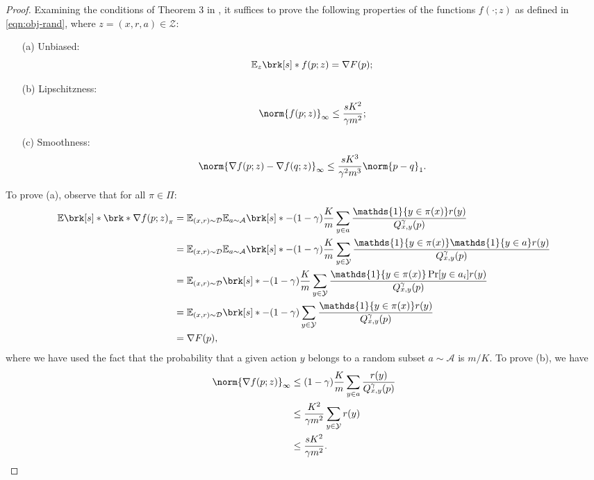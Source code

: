 \documentclass[11pt]{article}
\renewcommand{\ind}[1]{\mathds{1}\{#1\}}
\newcommand{\bbE}{\boldsymbol{\mathbb{E}}}
\renewcommand{\E}{\bbE}
\newcommand{\yprobg}[3]{Q^\gamma_{#2,#3}(#1)}
\newcommand{\pred}{a}
\newcommand{\rew}{r}
\newcommand{\lab}{y}
\newcommand{\calY}{\mathcal{Y}}
\newcommand{\calD}{\mathcal{D}}
\newcommand{\calA}{\mathcal{A}}
\newcommand{\calZ}{\mathcal{Z}}
\newcommand{\obj}{F}
\newcommand{\objrand}{f}
\theoremstyle{plain}
\begin{document}
\begin{proof}
    Examining the conditions of Theorem 3 in \cite{erez2024fast}, it suffices to prove the following properties of the functions $\objrand(\cdot;z)$ as defined in \cref{eqn:obj-rand}, where $z = (x,r,a) \in \calZ$:
    \begin{itemize}
        \item[(a)] Unbiased: \[
        \E_z \brk[s]*{\objrand(p;z)} = \nabla \obj(p);
        \]
        \item[(b)] Lipschitzness:
        \[
        \norm{\objrand(p;z)}_\infty \leq \frac{s K^2}{\gamma m^2};
        \]
        \item[(c)] Smoothness:
        \[
        \norm{\nabla \objrand(p;z) - \nabla \objrand(q;z)}_\infty \leq \frac{sK^3}{\gamma^2 m^3}\norm{p-q}_1.
        \]
    \end{itemize}
    To prove (a), observe that for all $\pi \in \Pi$:
    \begin{align*}
        \E \brk[s]*{\brk*{\nabla \objrand(p;z)}_\pi} 
        &= 
        \E_{(x,\rew) \sim \calD} \E_{\pred \sim \calA} \brk[s]*{- (1-\gamma) \frac{K}{m} \sum_{\lab \in \pred} \frac{\ind{\lab \in \pi(x)} \rew(\lab)}{\yprobg{p}{x}{y}}} \\
        &=
        \E_{(x,\rew) \sim \calD} \E_{\pred \sim \calA} \brk[s]*{- (1-\gamma) \frac{K}{m} \sum_{\lab \in \calY} \frac{\ind{\lab \in \pi(x)} \ind{\lab \in \pred} \rew(\lab)}{\yprobg{p}{x}{y}}} \\
        &=
        \E_{(x,\rew) \sim \calD} \brk[s]*{- (1-\gamma) \frac{K}{m} \sum_{\lab \in \calY} \frac{\ind{\lab \in \pi(x)} \Pr[\lab \in \pred_i] \rew(\lab)}{\yprobg{p}{x}{y}}} \\
        &=
        \E_{(x,\rew) \sim \calD} \brk[s]*{- (1-\gamma) \sum_{\lab \in \calY} \frac{\ind{\lab \in \pi(x)} \rew(\lab)}{\yprobg{p}{x}{y}}} \\
        &=
        \nabla \obj(p),
    \end{align*}
    where we have used the fact that the probability that a given action $\lab$ belongs to a random subset $\pred \sim \calA$ is $m / K$. To prove (b), we have
    \begin{align*}
        \norm{\nabla \objrand(p;z)}_\infty 
        &\leq 
        (1-\gamma) \frac{K}{m} \sum_{\lab \in \pred} \frac{\rew(\lab)}{\yprobg{p}{x}{\lab}} \\
        &\leq
        \frac{K^2}{\gamma m^2} \sum_{\lab \in \calY} \rew(\lab) \\
        &\leq \frac{s K^2}{\gamma m^2}.

\end{align*}
\end{proof}
\end{document}
